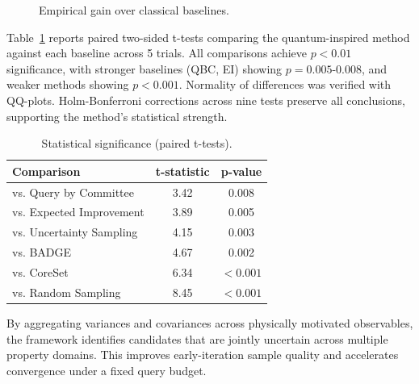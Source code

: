 \documentclass[conference]{IEEEtran}
\begin{document}
\begin{figure}[!t]
\centering
{}
\caption{Empirical gain over classical baselines.}
\label{fig:quantum_advantage}
\end{figure}

 Table~\ref{tab:statistical_tests} reports paired two-sided t-tests comparing the quantum-inspired method against each baseline across 5 trials. All comparisons achieve $p<0.01$ significance, with stronger baselines (QBC, EI) showing $p=0.005$-$0.008$, and weaker methods showing $p<0.001$. Normality of differences was verified with QQ-plots. Holm-Bonferroni corrections across nine tests preserve all conclusions, supporting the method's statistical strength.

\begin{table}[!t]
\centering
\caption{Statistical significance (paired t-tests).}
\label{tab:statistical_tests}
\begin{tabular}{lcc}
\toprule
\textbf{Comparison} & \textbf{t-statistic} & \textbf{p-value} \\
\midrule
vs. Query by Committee & 3.42 & 0.008 \\
vs. Expected Improvement & 3.89 & 0.005 \\
vs. Uncertainty Sampling & 4.15 & 0.003 \\
vs. BADGE & 4.67 & 0.002 \\
vs. CoreSet & 6.34 & $<0.001$ \\
vs. Random Sampling & 8.45 & $<0.001$ \\
\bottomrule
\end{tabular}
\end{table}

By aggregating variances and covariances across physically motivated observables, the framework identifies candidates that are jointly uncertain across multiple property domains. This improves early-iteration sample quality and accelerates convergence under a fixed query budget.
\end{document}
